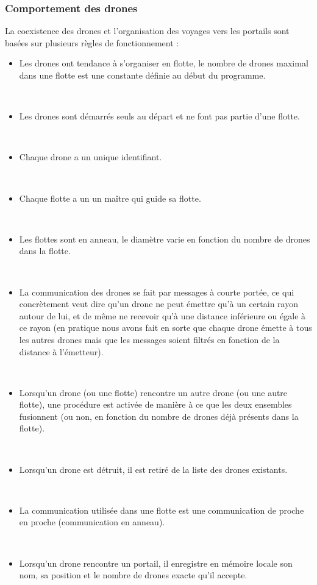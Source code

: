 \documentclass[11pt]{report}
\begin{document}
\subsubsection{Comportement des drones}

La coexistence des drones et l'organisation des voyages vers les portails sont basées sur plusieurs règles de fonctionnement : 

\begin{itemize}
\item Les drones ont tendance à s'organiser en flotte, le nombre de drones maximal dans une flotte est une constante définie au début du programme.

~\
\item Les drones sont démarrés seuls au départ et ne font pas partie d'une flotte.

~\
\item Chaque drone a un unique identifiant.

~\
\item Chaque flotte a un un maître qui guide sa flotte.

~\
\item Les flottes sont en anneau, le diamètre varie en fonction du nombre de drones dans la flotte.

~\
\item La communication des drones se fait par messages à courte portée, ce qui concrètement veut dire qu'un drone ne peut émettre qu'à un certain rayon autour de lui, et de même ne recevoir qu'à une distance inférieure ou égale à ce rayon (en pratique nous avons fait en sorte que chaque drone émette à tous les autres drones mais que les messages soient filtrés en fonction de la distance à l'émetteur).

~\
\item Lorsqu'un drone (ou une flotte) rencontre un autre drone (ou une autre flotte), une procédure est activée de manière à ce que les deux ensembles fusionnent (ou non, en fonction du nombre de drones déjà présents dans la flotte).

~\
\item Lorsqu'un drone est détruit, il est retiré de la liste des drones existants.

~\
\item La communication utilisée dans une flotte est une communication de proche en proche (communication en anneau).

~\
\item Lorsqu'un drone rencontre un portail, il enregistre en mémoire locale son nom, sa position et le nombre de drones exacte qu'il accepte.


\end{itemize}
\end{document}

